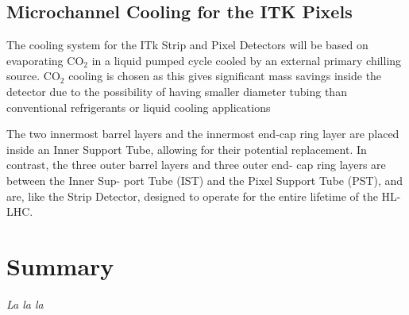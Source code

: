 \section{Microchannel Cooling for the ITK Pixels}
\label{sec:microchannels}
The cooling system for the ITk Strip and Pixel Detectors will be based on evaporating CO$_2$ in a liquid 
pumped cycle cooled by an external primary chilling source.  CO$_2$ cooling is chosen as this gives 
significant mass savings inside the detector due to the possibility of having smaller diameter tubing than 
conventional refrigerants or liquid cooling applications


The two innermost barrel layers and the innermost end-cap ring layer are placed inside an Inner Support 
Tube, allowing for their potential replacement. In contrast, the three outer barrel layers and three outer end-
cap ring layers are between the Inner Sup- port Tube (IST) and the Pixel Support Tube (PST), and are, like 
the Strip Detector, designed to operate for the entire lifetime of the HL-LHC.

\chapter*{Summary}
{\it La la la}

